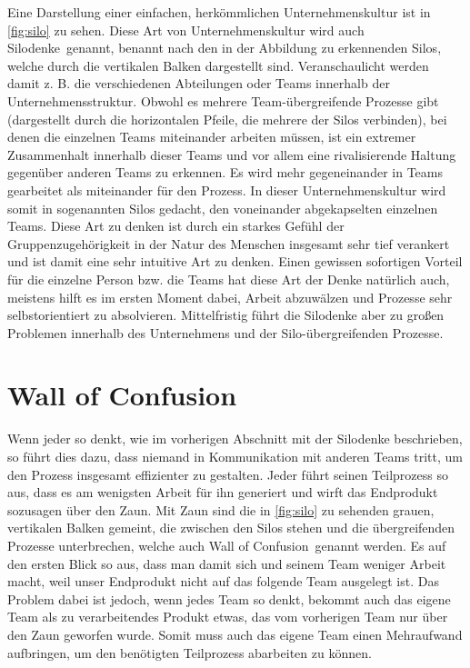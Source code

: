 Eine Darstellung einer einfachen, herkömmlichen Unternehmenskultur ist in \autoref{fig:silo} zu sehen. Diese Art von Unternehmenskultur wird auch \glqq Silodenke\grqq\ genannt, benannt nach den in der Abbildung zu erkennenden Silos, welche durch die vertikalen Balken dargestellt sind. Veranschaulicht werden damit z. B. die verschiedenen Abteilungen oder Teams innerhalb der Unternehmensstruktur. Obwohl es mehrere Team-übergreifende Prozesse gibt (dargestellt durch die horizontalen Pfeile, die mehrere der Silos verbinden), bei denen die einzelnen Teams miteinander arbeiten müssen, ist ein extremer Zusammenhalt innerhalb dieser Teams und vor allem eine rivalisierende Haltung gegenüber anderen Teams zu erkennen. Es wird mehr gegeneinander in Teams gearbeitet als miteinander für den Prozess. In dieser Unternehmenskultur wird somit in sogenannten Silos gedacht, den voneinander abgekapselten einzelnen Teams. Diese Art zu denken ist durch ein starkes Gefühl der Gruppenzugehörigkeit in der Natur des Menschen insgesamt sehr tief verankert und ist damit eine sehr intuitive Art zu  denken. Einen gewissen sofortigen Vorteil für die einzelne Person bzw. die Teams hat diese Art der Denke natürlich auch, meistens hilft es im ersten Moment dabei, Arbeit abzuwälzen und Prozesse sehr selbstorientiert zu absolvieren. Mittelfristig führt die Silodenke aber zu großen Problemen innerhalb des Unternehmens und der Silo-übergreifenden Prozesse.

\section{Wall of Confusion}

Wenn jeder so denkt, wie im vorherigen Abschnitt mit der Silodenke beschrieben, so führt dies dazu, dass niemand in Kommunikation mit anderen Teams tritt, um den Prozess insgesamt effizienter zu gestalten. Jeder führt seinen Teilprozess so aus, dass es am wenigsten Arbeit für ihn generiert und wirft das Endprodukt sozusagen \glqq über den Zaun\grqq. Mit Zaun sind die in \autoref{fig:silo} zu sehenden grauen, vertikalen Balken gemeint, die zwischen den Silos stehen und die übergreifenden Prozesse unterbrechen, welche auch \glqq Wall of Confusion\grqq\ genannt werden. Es auf den ersten Blick so aus, dass man damit sich und seinem Team weniger Arbeit macht, weil unser Endprodukt nicht auf das folgende Team ausgelegt ist. Das Problem dabei ist jedoch, wenn jedes Team so denkt, bekommt auch das eigene Team als zu verarbeitendes Produkt etwas, das vom vorherigen Team nur über den Zaun geworfen wurde. Somit muss auch das eigene Team einen Mehraufwand aufbringen, um den benötigten Teilprozess abarbeiten zu können.

